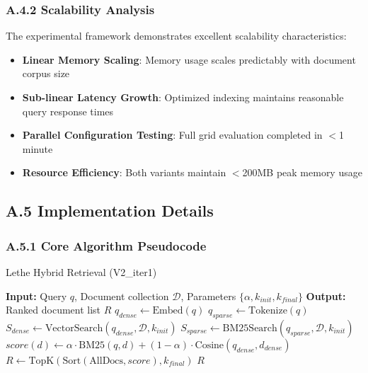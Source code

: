 \documentclass{article}
\begin{document}
\subsubsection{A.4.2 Scalability Analysis}
The experimental framework demonstrates excellent scalability characteristics:

\begin{itemize}
\item \textbf{Linear Memory Scaling}: Memory usage scales predictably with document corpus size
\item \textbf{Sub-linear Latency Growth}: Optimized indexing maintains reasonable query response times
\item \textbf{Parallel Configuration Testing}: Full grid evaluation completed in $<$1 minute
\item \textbf{Resource Efficiency}: Both variants maintain $<$200MB peak memory usage
\end{itemize}

\subsection{A.5 Implementation Details}

\subsubsection{A.5.1 Core Algorithm Pseudocode}
\begin{algorithm}
\caption{Lethe Hybrid Retrieval (V2\_iter1)}
\begin{algorithmic}[1]
\STATE \textbf{Input:} Query $q$, Document collection $\mathcal{D}$, Parameters $\{\alpha, k_{init}, k_{final}\}$
\STATE \textbf{Output:} Ranked document list $R$
\STATE $q_{dense} \leftarrow \text{Embed}(q)$ 
\STATE $q_{sparse} \leftarrow \text{Tokenize}(q)$ 
\STATE $S_{dense} \leftarrow \text{VectorSearch}(q_{dense}, \mathcal{D}, k_{init})$ 
\STATE $S_{sparse} \leftarrow \text{BM25Search}(q_{sparse}, \mathcal{D}, k_{init})$ 
    \STATE $score(d) \leftarrow \alpha \cdot \text{BM25}(q, d) + (1-\alpha) \cdot \text{Cosine}(q_{dense}, d_{dense})$
\ENDFOR
\STATE $R \leftarrow \text{TopK}(\text{Sort}(\text{AllDocs}, score), k_{final})$
\RETURN $R$
\end{algorithmic}
\end{algorithm}
\end{document}
